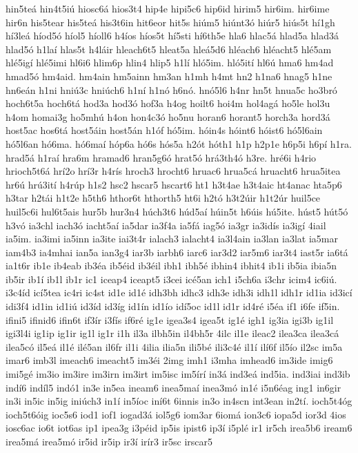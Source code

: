 {hin5teá
hin4t5iú
hiosc6á
hios3t4
hip4e
hipi5c6
hip6id
hirim5
hir6im.
hir6ime
hir6n
his5tear
his5teá
his3t6in
hit6eor
hit5s
hiúm5
hiúnt3ó
hiúr5
hiús5t
hí1gh
hí3leá
híod5ó
híol5
híoll6
h4íos
híos5t
hí5sti
hí6th5e
hla6
hlac5á
hlad5a
hlad3á
hlad5ó
h1laí
hlas5t
h4láir
hleach6t5
hleat5a
hleá5d6
hléach6
hléacht5
hlé5am
hlé5igí
hlé5imi
hl6i6
hlim6p
hlin4
hlip5
h1lí
hló5im.
hló5ití
hl6ú
hma6
hm4ad
hmad5ó
hm4aid.
hm4ain
hm5ainn
hm3an
h1mh
h4mt
hn2
h1na6
hnag5
h1ne
hn6eán
h1ni
hniú3c
hniúch6
h1ní
h1nó
h6nó.
hnó5l6
h4nr
hn5t
hnua5c
ho3bró
hoch6t5a
hoch6tá
hod3a
hod3ó
hof3a
h4og
hoilt6
hoi4m
hol4agá
ho5le
hol3u
h4om
homai3g
ho5mhú
h4on
hon4c3ó
ho5nu
horan6
horant5
horch3a
hord3á
host5ac
hos6tá
host5áin
host5án
h1óf
hó5im.
hóin4s
hóint6
hóist6
hó5l6ain
hó5l6an
hó6ma.
hó6maí
hóp6a
hó6s
hós5a
h2ót
hóth1
h1p
h2p1e
h6p5i
h6pí
h1ra.
hrad5á
h1raí
hra6m
hramad6
hran5g6ó
hrat5ó
hrá3th4ó
h3re.
hré6i
h4rio
hrioch5t6á
hrí2o
hrí3r
h4rís
hroch3
hrocht6
hruac6
hrua5cá
hruacht6
hrua5itea
hr6ú
hrú3ití
h4rúp
h1s2
hsc2
hscar5
hscart6
ht1
h3t4ae
h3t4aic
ht4anac
hta5p6
h3tar
h2tái
h1t2e
h5th6
hthor6t
hthorth5
ht6i
h2tó
h3t2úir
h1t2úr
huil5ce
huil5c6i
hul6t5ais
hur5b
hur3n4
húch3t6
húd5aí
húin5t
h6úis
hú5ite.
húst5
hút5ó
h3vó
ia3chl
iach3ó
iacht5aí
ia5dar
ia3f4a
ia5fá
iag5ó
ia3gr
ia3idís
ia3igí
4iail
ia5im.
ia3imi
ia5inn
ia3ite
iai3t4r
ialach3
ialacht4
ia3l4ain
ia3lan
ia3lat
ia5mar
iam4b3
ia4mhai
ian5a
ian3g4
iar3b
iarbh6
iarc6
iar3d2
iar5m6
iar3t4
iast5r
ia6tá
ia1t6r
ib1e
ib4eab
ib3éa
ib5éid
ib3éil
ibh1
ibh5é
ibhin4
ibhit4
ib1i
ib5ia
ibia5n
ib5ir
ib1í
ib1l
ib1r
ic1
iceap4
iceapt5
i3cei
icé5an
ich1
i5ch6a
i3chr
icim4
ic6iú.
i3c4íd
icí5tea
ic4ri
ic4st
id1e
id1é
idh3bh
idhc3
idh3e
idh3i
idh1l
idh1r
id1ia
id3icí
idi3f4
id1in
id1iú
id3íd
id3íg
id1ín
id1ío
idí5oc
id1l
id1r
id4ré
i5éa
if1
i6fe
if5in.
ifini5
ifinid6
ifin6t
if3ír
i3fís
if6ré
ig1e
igea3s4
igea5t
ig1é
igh1
ig3ia
igi3b
ig1il
igi3l4i
ig1ip
ig1ir
ig1l
ig1r
i1h
il3a
ilbh5in
il4bh5r
4ilc
il1e
ileac2
ilea3ca
ilea3cá
ilea5có
il5eá
il1é
ilé5an
il6fr
il1i
4ilia
ilia5n
ili5bé
ili3c4é
il1í
ilí6f
il5ío
il2sc
im5a
imar6
imb3l
imeach6
imeacht5
im3éi
2img
imh1
i3mha
imhead6
im3ide
imig6
imi5gé
im3io
im3ire
im3irn
im3irt
im5isc
im5írí
in3á
ind3eá
ind5ia.
ind3iai
ind3ib
indí6
indíl5
indó1
in3e
in5ea
ineam6
inea5maí
inea3mó
in1é
i5n6éag
ing1
in6gir
in3i
in5ic
in5ig
iniúch3
in1í
in5íoc
iní6t
6innis
in3o
in4scn
int3ean
in2tí.
ioch5t4óg
ioch5t6óig
ioc5s6
iod1
iof1
iogad3á
iol5g6
iom3ar
6iomá
ion3c6
iopa5d
ior3d
4ios
iosc6ac
io6t
iot6as
ip1
ipea3g
i3péid
ip5is
ipist6
ip3í
i5plé
ir1
ir5ch
irea5b6
iream6
irea5má
irea5mó
ir5id
ir5ip
ir3í
irír3
ir5sc
irscar5
}
